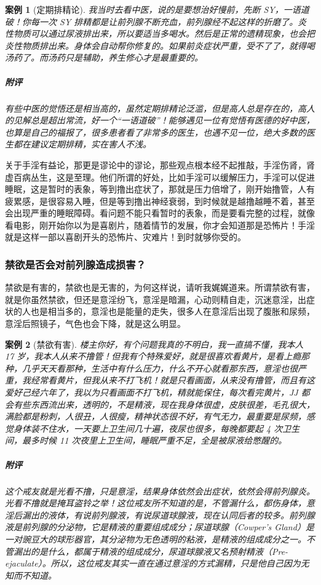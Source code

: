 \documentclass{ctexart}
\newtheorem{case}{案例}
\begin{document}
\begin{case}[定期排精论]
    我当时去看中医，说的是要想治好慢前，先断 SY，一语道破！你每一次 SY 排精都是让前列腺不断充血，前列腺经不起这样的折磨了。炎性物质可以通过尿液排出来，所以要适当多喝水。然后是正常的遗精现象，也会把炎性物质排出来。身体会自动帮你修复的。如果前炎症状严重，受不了了，就得喝汤药了。而汤药只是辅助，养生修心才是最重要的。
    \subparagraph{附评} 有些中医的觉悟还是相当高的，虽然定期排精论泛滥，但是高人总是存在的，高人的见解总是超出常流，好一个“一语道破”！能够遇见一位有觉悟有医德的好中医，也算是自己的福报了，很多患者看了非常多的医生，也遇不见一位，绝大多数的医生都在建议定期排精，实在害人不浅。
\end{case}

关于手淫有益论，那更是谬论中的谬论，那些观点根本经不起推敲，手淫伤肾，肾虚百病丛生，这是至理。他们所谓的好处，比如手淫可以缓解压力，手淫可以促进睡眠，这是暂时的表象，等到撸出症状了，那就是压力倍增了，刚开始撸管，人有疲累感，是很容易入睡，但是等到撸出神经衰弱，到时候就是越撸越睡不着，甚至会出现严重的睡眠障碍。看问题不能只看暂时的表象，而是要看完整的过程，就像看电影，刚开始你以为是喜剧片，随着情节的发展，你才会知道那是恐怖片！手淫就是这样一部以喜剧开头的恐怖片、灾难片！到时就够你受的。

\subsubsection{禁欲是否会对前列腺造成损害？}

禁欲是有害的，禁欲也是无害的，为何这样说，请听我娓娓道来。所谓禁欲有害，就是你虽然禁欲，但还是意淫纷飞，意淫是暗漏，心动则精自走，沉迷意淫，出症状的人也是相当多的，意淫也是能量的走失，很多人在意淫后出现了腹胀和尿频，意淫后照镜子，气色也会下降，就是这么明显。

\begin{case}[禁欲有害]
    楼主你好，有个问题我真的不明白，我一直搞不懂，我本人 17 岁，我本人从来不撸管！但我有个特殊爱好，就是很喜欢看黄片，是看上瘾那种，几乎天天看那种，生活中有什么压力，什么不开心就看那东西，意淫也很严重，我经常看黄片，但我从来不打飞机！就是只看画面，从来没有撸管，而且有这爱好己经六年了，我以为只看画面不打飞机，精就能保住，每次看完黄片，JJ 都会有些东西流出来，透明的，不是精液，现在我身体很虚，皮肤很差，毛孔很大，满脸都是粉刺，人很丑，人很瘦，精神状态很不好，有气无力，最重要是尿频，感觉身体装不住水，一天要上卫生间几十遍，夜尿也很多，每晚都要起 4 次卫生间，最多时候 11 次夜里上卫生间，睡眠严重不足，全是被尿液给憋醒的。
    \subparagraph{附评} 这个戒友就是光看不撸，只是意淫，结果身体依然会出症状，依然会得前列腺炎。光看不撸就是掩耳盗铃之举！这位戒友所不知道的是，不管漏什么，都伤身体，意淫后漏出的液体，有说前列腺液，有说尿道球腺液，现在认同后者的较多。前列腺液是前列腺的分泌物，它是精液的重要组成成分；尿道球腺（Cowper's Gland）是一对豌豆大的球形器官，其分泌物为无色透明的粘液，是精液的组成成分之一。不管漏出的是什么，都属于精液的组成成分，尿道球腺液又名预射精液（Pre-ejaculate）。所以，这位戒友其实一直在通过意淫的方式漏精，只是他自己因为无知而不知道。
\end{case}
\end{document}
